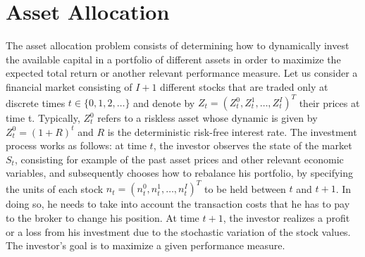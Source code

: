 \chapter{Asset Allocation}

The asset allocation problem consists of determining how to dynamically invest
the available capital in a portfolio of different assets in order to maximize
the expected total return or another relevant performance measure. Let us
consider a financial market consisting of $I+1$ different stocks that are
traded only at discrete times $t \in \{0, 1, 2, \ldots\}$ and denote by $Z_t =
{(Z_t^0, Z_t^1, \ldots, Z_t^I)}^T$ their prices at time t. Typically, $Z_t^0$
refers to a riskless asset whose dynamic is given by $Z_t^0 = {(1 + R)}^t$ and
$R$ is the deterministic risk-free interest rate. The investment process works
as follows: at time $t$, the investor observes the state of the market $S_t$,
consisting for example of the past asset prices and other relevant economic
variables, and subsequently chooses how to rebalance his portfolio, by
specifying the units of each stock $n_t = {(n_t^0 , n_t^1 , \ldots , n_t^I)}^T$
to be held between $t$ and $t+1$. In doing so, he needs to take into account
the transaction costs that he has to pay to the broker to change his position.
At time $t+1$, the investor realizes a profit or a loss from his investment due
to the stochastic variation of the stock values. The investor’s goal is to
maximize a given performance measure.

